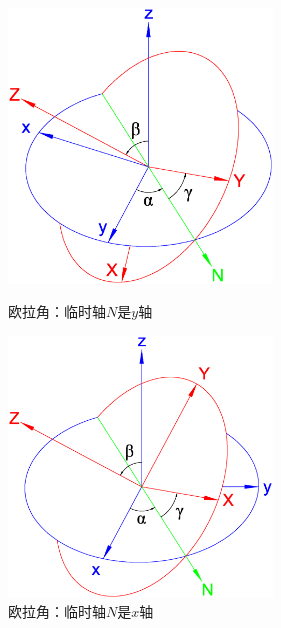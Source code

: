 \begin{figure}[htb]
    \begin{minipage}[t]{0.49\textwidth}
        \centering
        \includegraphics[width=7cm]{fig/ch13-eulerangleY.eps}
        \caption{欧拉角：临时轴$N$是$y$轴} \label{chlg:fig_euler}
    \end{minipage}
    \begin{minipage}[t]{0.49\textwidth}
        \centering
        \includegraphics[width=7cm]{fig/ch13-eulerangleX.eps}
        \caption{欧拉角：临时轴$N$是$x$轴} \label{chlg:fig_euler2}
    \end{minipage}
\end{figure}


